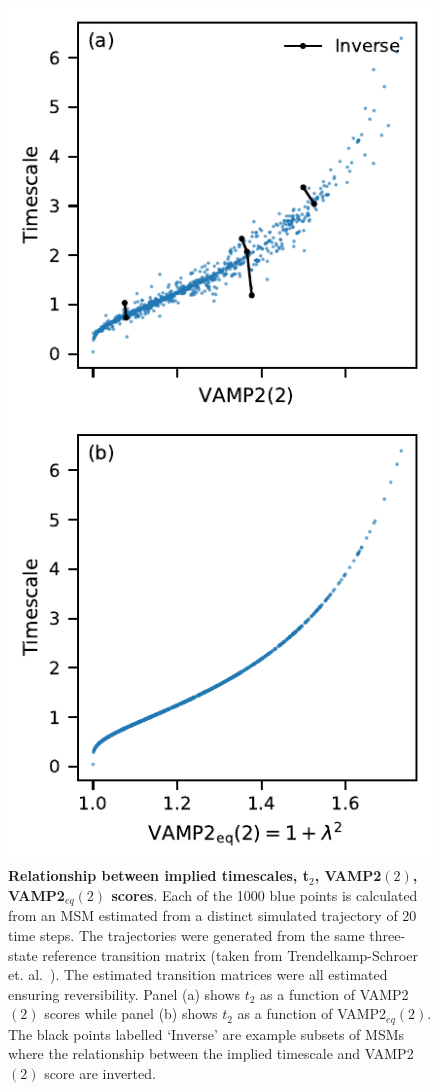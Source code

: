 \documentclass[journal=jacsat,manuscript=article]{achemso}
\begin{document}
\begin{figure}
    \centering
    \includegraphics{results2/timescale_vs_vamp_vs_evs.pdf}
    \caption{\textbf{Relationship between implied timescales, t$_2$, VAMP2$(2)$, VAMP2$_{eq}(2)$ scores}.  Each of the \num{1000} blue points is calculated from an MSM estimated from a distinct simulated trajectory of 20 time steps. The trajectories were generated from the same three-state reference transition matrix (taken from Trendelkamp-Schroer et. al.~\cite{trendelkamp-schroerEstimationUncertaintyReversible2015b}). The estimated transition matrices were all estimated ensuring reversibility. Panel (a) shows $t_2$ as a function of VAMP2$(2)$ scores while panel (b) shows  $t_2$ as a function of VAMP2$_{eq}(2)$. The black points labelled `Inverse' are example subsets of MSMs where the relationship between the implied timescale and VAMP2$(2)$ score are inverted.}
    \label{fig:bad_vamps_examples}
\end{figure}
\end{document}
